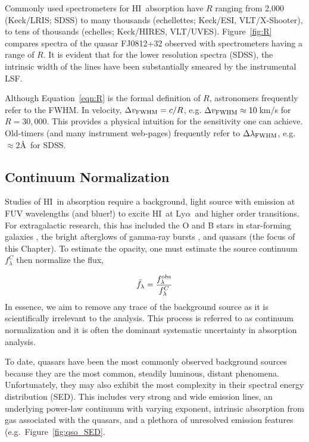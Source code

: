 \documentclass[graybox]{svmult}
\newcommand{\HI}{H{\sc I}}
\def\lya{Ly$\alpha$}
\begin{document}
Commonly used spectrometers for \HI\ absorption have $R$ ranging
from 2,000 (Keck/LRIS; SDSS) to many thousands (echellettes; 
Keck/ESI, VLT/X-Shooter), to tens of thousands
(echelles; Keck/HIRES, VLT/UVES).  Figure~\ref{fig:R}
compares spectra of the quasar FJ0812+32 observed
with spectrometers having a range of $R$.  It is evident
that for the lower resolution spectra (SDSS), the intrinsic
width of the lines have been substantially smeared by the 
instrumental LSF.

Although Equation~\ref{eqn:R} is the formal definition of $R$,
astronomers frequently refer to the FWHM.  In velocity,
$\Delta v_{\rm FWHM} = c/R$, e.g. 
$\Delta v_{\rm FWHM} \approx 10$\,km/s for $R = 30,000$.
This provides a physical intuition for the sensitivity
one can achieve.  Old-timers (and many instrument web-pages)
frequently refer to $\Delta \lambda_{\rm FWHM}$, e.g.\ $\approx 2$\AA\
for SDSS.

\subsection{Continuum Normalization}
Studies of \HI\ in absorption require a background, light source
with emission at FUV wavelengths (and bluer!) to excite \HI\
at \lya\ and higher order transitions.
For extragalactic research, this has included the O and B stars
in star-forming galaxies \cite{lee+14}, the bright afterglows
of gamma-ray bursts \cite{fjp+09}, and quasars (the focus
of this Chapter).   To estimate the opacity, one must estimate
the source continuum $f^C_\lambda$ then normalize the flux, 

\begin{equation}
\bar f_\lambda = \frac{f_\lambda^{\rm obs}}{f_\lambda^C}
\end{equation}
In essence, we aim to remove any trace of the background
source as it is scientifically irrelevant to the analysis.
This process is referred to as continuum normalization and
it is often the dominant systematic uncertainty in absorption
analysis.

To date, quasars have been the most commonly observed background
sources because they are the most common, steadily luminous, distant
phenomena.   Unfortunately, they may also exhibit the most complexity
in their spectral energy distribution (SED).  This includes
very strong and wide emission lines, an underlying power-law
continuum with varying exponent, intrinsic absorption from gas
associated with the quasars, and a plethora of unresolved emission
features (e.g.\ Figure~\ref{fig:qso_SED}.
\end{document}
